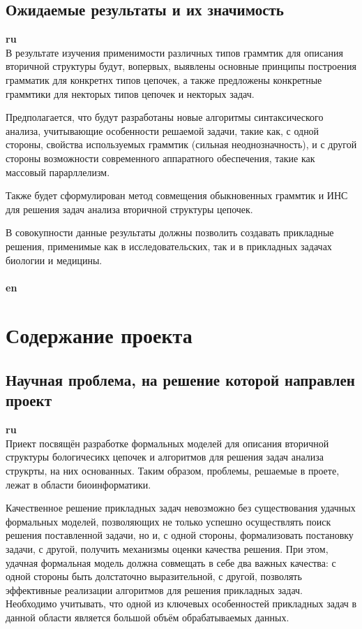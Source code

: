﻿\documentclass[12pt]{article}  %
\theoremstyle{remark}
\begin{document}
\subsection{Ожидаемые результаты и их значимость}

\textbf{ru}\\
В результате изучения применимости различных типов граммтик для описания вторичной структуры будут, вопервых, выявлены основные принципы построения грамматик для конкретнх типов цепочек, а также предложены конкретные граммтики для некторых типов цепочек и некторых задач.

Предполагается, что будут разработаны новые алгоритмы синтаксического анализа, учитывающие особенности решаемой задачи, такие как, с одной стороны, свойства используемых граммтик (сильная неоднозначность), и с другой стороны возможности современного аппаратного обеспечения, такие как массовый парарллелизм.

Также будет сформулирован метод совмещения обыкновенных граммтик и ИНС для решения задач анализа вторичной структуры цепочек.

В совокупности данные результаты должны позволить создавать прикладные решения, применимые как в исследовательских, так и в прикладных задачах биологии и медицины.
\\
\\
\textbf{en}\\


\section{Содержание проекта}

\subsection{Научная проблема, на решение которой направлен проект}

\textbf{ru}\\
Приект посвящён разработке формальных моделей для описания вторичной структуры бологичесикх цепочек и алгоритмов для решения задач анализа струкрты, на них основанных. Таким образом, проблемы, решаемые в проете, лежат в области биоинформатики.

Качественное решение прикладных задач невозможно без существования удачных формальных моделей, позволяющих не только успешно осуществлять поиск решения поставленной задачи, но и, с одной стороны, формализовать постановку задачи, с другой, получить механизмы оценки качества решения.
При этом, удачная формальная модель должна совмещать в себе два важных качества: с одной стороны быть долстаточно выразительной, с другой, позволять эффективные реализации алгоритмов для решения прикладных задач.
Необходимо учитывать, что одной из ключевых особенностей прикладных задач в данной области является большой объём обрабатываемых данных.
\end{document}
